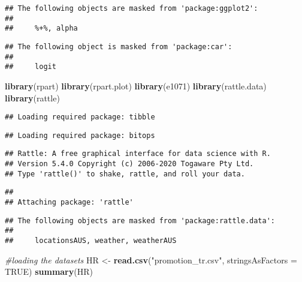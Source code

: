 \documentclass[
]{article}
\newenvironment{Shaded}{\begin{snugshade}}{\end{snugshade}}
\newcommand{\CommentTok}[1]{\textcolor[rgb]{0.56,0.35,0.01}{\textit{#1}}}
\newcommand{\DataTypeTok}[1]{\textcolor[rgb]{0.13,0.29,0.53}{#1}}
\newcommand{\KeywordTok}[1]{\textcolor[rgb]{0.13,0.29,0.53}{\textbf{#1}}}
\newcommand{\NormalTok}[1]{#1}
\newcommand{\OtherTok}[1]{\textcolor[rgb]{0.56,0.35,0.01}{#1}}
\newcommand{\StringTok}[1]{\textcolor[rgb]{0.31,0.60,0.02}{#1}}
\begin{document}
\begin{verbatim}
## The following objects are masked from 'package:ggplot2':
## 
##     %+%, alpha
\end{verbatim}

\begin{verbatim}
## The following object is masked from 'package:car':
## 
##     logit
\end{verbatim}

\begin{Shaded}
\begin{Highlighting}[]
\KeywordTok{library}\NormalTok{(rpart)}
\KeywordTok{library}\NormalTok{(rpart.plot)}
\KeywordTok{library}\NormalTok{(e1071)}
\KeywordTok{library}\NormalTok{(rattle.data)}
\KeywordTok{library}\NormalTok{(rattle)}
\end{Highlighting}
\end{Shaded}

\begin{verbatim}
## Loading required package: tibble
\end{verbatim}

\begin{verbatim}
## Loading required package: bitops
\end{verbatim}

\begin{verbatim}
## Rattle: A free graphical interface for data science with R.
## Version 5.4.0 Copyright (c) 2006-2020 Togaware Pty Ltd.
## Type 'rattle()' to shake, rattle, and roll your data.
\end{verbatim}

\begin{verbatim}
## 
## Attaching package: 'rattle'
\end{verbatim}

\begin{verbatim}
## The following objects are masked from 'package:rattle.data':
## 
##     locationsAUS, weather, weatherAUS
\end{verbatim}

\begin{Shaded}
\begin{Highlighting}[]
\CommentTok{#loading the datasets }
\NormalTok{HR <-}\StringTok{ }\KeywordTok{read.csv}\NormalTok{(}\StringTok{"promotion_tr.csv"}\NormalTok{, }\DataTypeTok{stringsAsFactors =} \OtherTok{TRUE}\NormalTok{)}
\KeywordTok{summary}\NormalTok{(HR)}
\end{Highlighting}
\end{Shaded}
\end{document}
